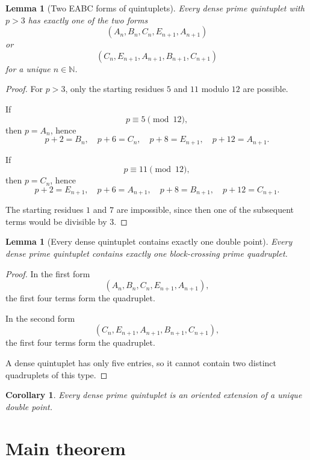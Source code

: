 \documentclass[11pt,a4paper]{article}
\newtheorem{lemma}[theorem]{Lemma}
\newtheorem{corollary}[theorem]{Corollary}
\theoremstyle{definition}
\theoremstyle{remark}
\newcommand{\N}{\mathbb{N}}
\begin{document}
	\begin{lemma}[Two EABC forms of quintuplets]
		Every dense prime quintuplet with \(p>3\) has exactly one of the two forms
		\[
		(A_n,B_n,C_n,E_{n+1},A_{n+1})
		\]
		or
		\[
		(C_n,E_{n+1},A_{n+1},B_{n+1},C_{n+1})
		\]
		for a unique \(n\in\N\).
	\end{lemma}
	
	\begin{proof}
		For \(p>3\), only the starting residues \(5\) and \(11\) modulo \(12\) are possible.
		
		If
		\[
		p\equiv 5 \pmod{12},
		\]
		then \(p=A_n\), hence
		\[
		p+2=B_n,\quad p+6=C_n,\quad p+8=E_{n+1},\quad p+12=A_{n+1}.
		\]
		
		If
		\[
		p\equiv 11 \pmod{12},
		\]
		then \(p=C_n\), hence
		\[
		p+2=E_{n+1},\quad p+6=A_{n+1},\quad p+8=B_{n+1},\quad p+12=C_{n+1}.
		\]
		
		The starting residues \(1\) and \(7\) are impossible, since then one of the subsequent terms would be divisible by \(3\).
	\end{proof}
	
	\begin{lemma}[Every dense quintuplet contains exactly one double point]
		Every dense prime quintuplet contains exactly one block-crossing prime quadruplet.
	\end{lemma}
	
	\begin{proof}
		In the first form
		\[
		(A_n,B_n,C_n,E_{n+1},A_{n+1}),
		\]
		the first four terms form the quadruplet.
		
		In the second form
		\[
		(C_n,E_{n+1},A_{n+1},B_{n+1},C_{n+1}),
		\]
		the first four terms form the quadruplet.
		
		A dense quintuplet has only five entries, so it cannot contain two distinct quadruplets of this type.
	\end{proof}
	
	\begin{corollary}
		Every dense prime quintuplet is an oriented extension of a unique double point.
	\end{corollary}
	
	\section{Main theorem}
	
\end{document}
